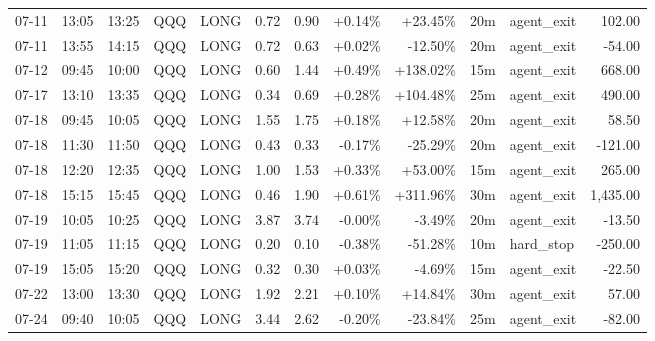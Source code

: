 \documentclass[11pt,a4paper]{article}
\begin{document}
\begin{center}
\begin{longtable}{>{\color{txtmain}}l l l l l r r r r r >{\color{txtmain}}l r}
07-11 & 13:05 & 13:25 & QQQ & LONG & 0.72 & 0.90 & \textcolor{wingreen}{+0.14\%} & \textcolor{wingreen}{+23.45\%} & 20m & agent\_exit & \textcolor{wingreen}{102.00} \\
07-11 & 13:55 & 14:15 & QQQ & LONG & 0.72 & 0.63 & \textcolor{wingreen}{+0.02\%} & \textcolor{lossred}{-12.50\%} & 20m & agent\_exit & \textcolor{lossred}{-54.00} \\
07-12 & 09:45 & 10:00 & QQQ & LONG & 0.60 & 1.44 & \textcolor{wingreen}{+0.49\%} & \textcolor{wingreen}{+138.02\%} & 15m & agent\_exit & \textcolor{wingreen}{668.00} \\
07-17 & 13:10 & 13:35 & QQQ & LONG & 0.34 & 0.69 & \textcolor{wingreen}{+0.28\%} & \textcolor{wingreen}{+104.48\%} & 25m & agent\_exit & \textcolor{wingreen}{490.00} \\
07-18 & 09:45 & 10:05 & QQQ & LONG & 1.55 & 1.75 & \textcolor{wingreen}{+0.18\%} & \textcolor{wingreen}{+12.58\%} & 20m & agent\_exit & \textcolor{wingreen}{58.50} \\
07-18 & 11:30 & 11:50 & QQQ & LONG & 0.43 & 0.33 & \textcolor{lossred}{-0.17\%} & \textcolor{lossred}{-25.29\%} & 20m & agent\_exit & \textcolor{lossred}{-121.00} \\
07-18 & 12:20 & 12:35 & QQQ & LONG & 1.00 & 1.53 & \textcolor{wingreen}{+0.33\%} & \textcolor{wingreen}{+53.00\%} & 15m & agent\_exit & \textcolor{wingreen}{265.00} \\
07-18 & 15:15 & 15:45 & QQQ & LONG & 0.46 & 1.90 & \textcolor{wingreen}{+0.61\%} & \textcolor{wingreen}{+311.96\%} & 30m & agent\_exit & \textcolor{wingreen}{1,435.00} \\
07-19 & 10:05 & 10:25 & QQQ & LONG & 3.87 & 3.74 & \textcolor{lossred}{-0.00\%} & \textcolor{lossred}{-3.49\%} & 20m & agent\_exit & \textcolor{lossred}{-13.50} \\
07-19 & 11:05 & 11:15 & QQQ & LONG & 0.20 & 0.10 & \textcolor{lossred}{-0.38\%} & \textcolor{lossred}{-51.28\%} & 10m & hard\_stop & \textcolor{lossred}{-250.00} \\
07-19 & 15:05 & 15:20 & QQQ & LONG & 0.32 & 0.30 & \textcolor{wingreen}{+0.03\%} & \textcolor{lossred}{-4.69\%} & 15m & agent\_exit & \textcolor{lossred}{-22.50} \\
07-22 & 13:00 & 13:30 & QQQ & LONG & 1.92 & 2.21 & \textcolor{wingreen}{+0.10\%} & \textcolor{wingreen}{+14.84\%} & 30m & agent\_exit & \textcolor{wingreen}{57.00} \\
07-24 & 09:40 & 10:05 & QQQ & LONG & 3.44 & 2.62 & \textcolor{lossred}{-0.20\%} & \textcolor{lossred}{-23.84\%} & 25m & agent\_exit & \textcolor{lossred}{-82.00} \\

\end{longtable}
\end{center}
\end{document}
